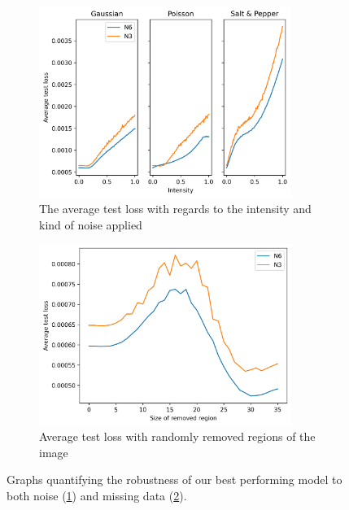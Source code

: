 \documentclass[twocolumn]{article}
\begin{document}
\begin{figure}
    \centering
    \begin{subfigure}{0.4\textwidth}
        \centering
        \includegraphics[width=0.9\textwidth]{assets/noise-results.png}
        \caption{The average test loss with regards to the intensity and kind of noise applied}
        \label{fig:robust-results}
    \end{subfigure}\hfill
    \begin{subfigure}{0.4\textwidth}
        \centering
        \includegraphics[width=0.9\textwidth]{assets/missing-data.png}
        \caption{Average test loss with randomly removed regions of the image}
        \label{fig:missing-results}
    \end{subfigure}
    \caption{Graphs quantifying the robustness of our best performing model to both noise (\ref{fig:robust-results}) and missing data (\ref{fig:missing-results}).}
    \label{fig:robustness}
\end{figure}
\end{document}

